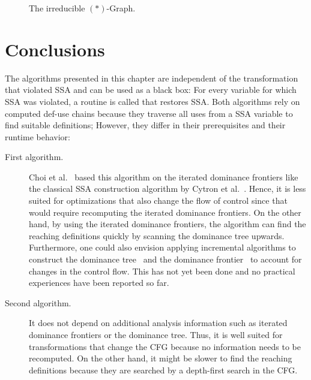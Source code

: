 {\begin{figure}
    \hfil{}\hfil\strut
    \caption{The irreducible $(\ast)$-Graph.}
    \label{fig:astgraph}
\end{figure}


\section{Conclusions}


The algorithms presented in this chapter are independent of the transformation that violated SSA and can be used as a black box:
For every variable for which SSA was violated, a routine is called that restores SSA.
Both algorithms rely on computed def-use chains because they traverse all uses from a SSA variable to find suitable definitions;
However, they differ in their prerequisites and their runtime behavior:
\begin{description}
	\item[First algorithm.]
		Choi et al.~\cite{Choi:1996ji} based this algorithm on the iterated dominance frontiers like the classical SSA construction algorithm by Cytron et al.~\cite{cytron:1991:ssa}.
		Hence, it is less suited for optimizations that also change the flow of control since that would require recomputing the iterated dominance frontiers.
		On the other hand, by using the iterated dominance frontiers, the algorithm can find the reaching definitions quickly by scanning the dominance tree upwards.
		Furthermore, one could also envision applying incremental algorithms to construct the dominance tree~\cite{Ramalingam:1994iq,Sreedhar:1995:ICD:202529.202531} and the dominance frontier~\cite{Sreedhar:1996:NFE:231379.231434} to account for changes in the control flow.
		This has not yet been done and no practical experiences have been reported so far.

	\item[Second algorithm.]
		It does not depend on additional analysis information such as iterated dominance frontiers or the dominance tree.
		Thus, it is well suited for transformations that change the CFG because no information needs to be recomputed.
		On the other hand, it might be slower to find the reaching definitions because they are searched by a depth-first search in the CFG.
\end{description}

}
